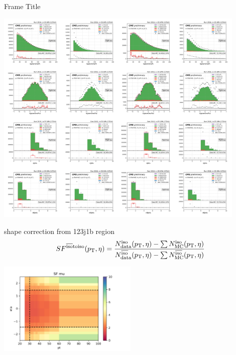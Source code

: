 \begin{frame}{Frame Title}

    \begin{center}
        \includegraphics[width=0.9\textwidth, trim=0 52cm 28cm 0, clip]{chapters/Analysis/sectionBackground/figures/ljets_kinematics/4j1b.png}
    \end{center}
    
    shape correction from 123j1b region
    \begin{equation}
        SF^{\rm \overline{iso} to iso} (p_{\mathrm{T}}, \eta) =  \frac{N^{\rm iso}_{\rm data} (p_{\mathrm{T}}, \eta) - \sum N^{\rm iso}_{\rm MC}(p_{\mathrm{T}}, \eta) } {N^{\rm \overline{iso}}_{\rm data} (p_{\mathrm{T}}, \eta)- \sum N^{\rm \overline{iso}}_{\rm MC}(p_{\mathrm{T}}, \eta) }
    \end{equation}

    
    \begin{center}
        \includegraphics[width=0.5\textwidth]{chapters/Analysis/sectionBackground/figures/ljets_kinematics/123j1b/SF_mu_2d.png}
    \end{center}
\end{frame}


